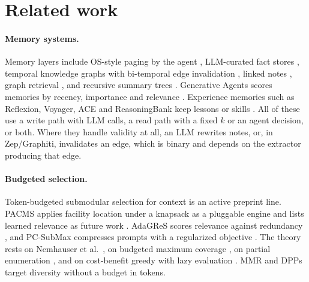 \section{Related work}

\paragraph{Memory systems.} Memory layers include OS-style paging by the agent \cite{packer2023memgpt}, LLM-curated fact stores \cite{chhikara2025mem0}, temporal knowledge graphs with bi-temporal edge invalidation \cite{rasmussen2025zep}, linked notes \cite{xu2025amem}, graph retrieval \cite{gutierrez2025hipporag2,edge2024graphrag,guo2024lightrag}, and recursive summary trees \cite{sarthi2024raptor}. Generative Agents scores memories by recency, importance and relevance \cite{park2023generative}. Experience memories such as Reflexion, Voyager, ACE and ReasoningBank keep lessons or skills \cite{shinn2023reflexion,wang2023voyager,zhang2025ace,ouyang2025reasoningbank}. All of these use a write path with LLM calls, a read path with a fixed $k$ or an agent decision, or both. Where they handle validity at all, an LLM rewrites notes, or, in Zep/Graphiti, invalidates an edge, which is binary and depends on the extractor producing that edge.

\paragraph{Budgeted selection.} Token-budgeted submodular selection for context is an active preprint line. PACMS applies facility location under a knapsack as a pluggable engine and lists learned relevance as future work \cite{pacms2026}. AdaGReS scores relevance against redundancy \cite{adagres2025}, and PC-SubMax compresses prompts with a regularized objective \cite{pcsubmax2026}. The theory rests on Nemhauser et al.\ \cite{nemhauser1978analysis}, on budgeted maximum coverage \cite{khuller1999budgeted}, on partial enumeration \cite{sviridenko2004note,feldman2023practical}, and on cost-benefit greedy with lazy evaluation \cite{krause2005note,minoux1978accelerated,leskovec2007cost}. MMR \cite{carbonell1998mmr} and DPPs \cite{kulesza2012dpp} target diversity without a budget in tokens.

